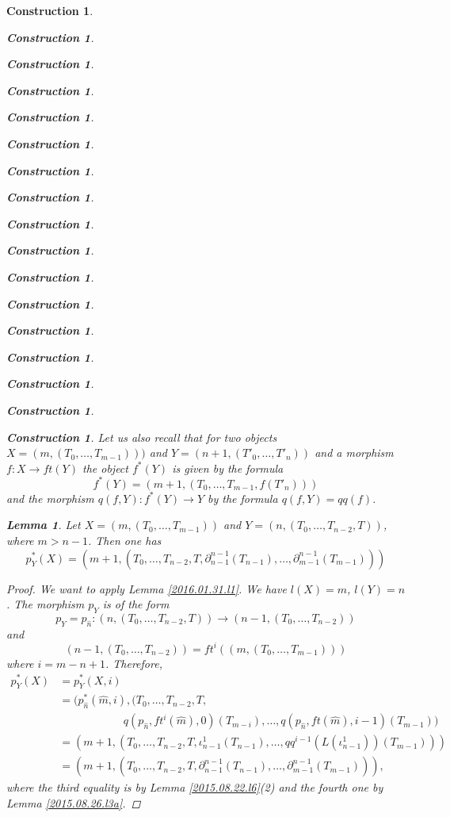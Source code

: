 \documentclass[onecolumn,12pt]{amsart}
\newtheorem{lemma}[proposition]{Lemma}
\numberwithin{proposition}{subsection}
\newtheorem{construction}[proposition]{Construction}
\newcommand{\sr}{\rightarrow}
\newcommand{\wh}{\widehat}
\newcommand{\spc}{{\,\,\,\,\,\,\,}}
\begin{document}
\begin{construction}
\begin{construction}
\begin{construction}
\begin{construction}
\begin{construction}
\begin{construction}
\begin{construction}
\begin{construction}
\begin{construction}
\begin{construction}
\begin{construction}
\begin{construction}
\begin{construction}
\begin{construction}
\begin{construction}
\begin{construction}
\begin{construction}
Let us also recall that for two objects $X=(m,(T_0,\dots,T_{m-1})))$ and
$Y=(n+1,(T'_0,\dots,T'_{n}))$ and a morphism $f:X\sr ft(Y)$ the object $f^*(Y)$
is given by the formula
%
\begin{equation}\label{2015.09.09.eq3old}
f^*(Y)=(m+1,(T_0,\dots,T_{m-1},f(T'_{n})))
\end{equation}%
%
and the morphism $q(f,Y):f^*(Y)\sr Y$ by the formula $q(f,Y)=qq(f)$. 
% 
\begin{lemma}
\label{2015.08.26.l8}
Let $X=(m,(T_0,\dots,T_{m-1}))$ and $Y=(n,(T_0,\dots,T_{n-2},T))$, where $m>n-1$. Then one has
%
$$p_{Y}^*(X)=(m+1,(T_0,\dots,T_{n-2},T,\partial_{n-1}^{n-1}(T_{n-1}),\dots,\partial_{m-1}^{n-1}(T_{m-1})))$$
%
\end{lemma}
%
\begin{proof}
We want to apply Lemma \ref{2016.01.31.l1}. We have $l(X)=m$, $l(Y)=n$. The morphism $p_Y$ is of the form
%
$$p_Y=p_{\wh{n}}:(n,(T_0,\dots,T_{n-2},T))\sr (n-1,(T_0,\dots,T_{n-2}))$$
%
and 
%
$$(n-1,(T_0,\dots,T_{n-2}))=ft^i((m,(T_0,\dots,T_{m-1})))$$
%
where $i=m-n+1$. Therefore, 
%
\begin{equation*}
  \begin{split}
    p_Y^*(X)&=p_Y^*(X,i)
    \\&=
    (p_{\wh{n}}^*(\wh{m},i), (T_0,\dots,T_{n-2},T,
    \\& \spc\spc\spc\spc\spc
           q(p_{\wh{n}},ft^i(\wh{m}),0)(T_{m-i}),\dots,q(p_{\wh{n}},ft(\wh{m}),i-1)(T_{m-1}))
    \\&=
    (m+1,(T_0,\dots,T_{n-2},T,\iota_{n-1}^1(T_{n-1}),\dots,qq^{i-1}(L(\iota_{n-1}^1))(T_{m-1})))
    \\&=
    (m+1,(T_0,\dots,T_{n-2},T,\partial_{n-1}^{n-1}(T_{n-1}),\dots,\partial_{m-1}^{n-1}(T_{m-1}))),
  \end{split}
\end{equation*}
%
where the third equality is by Lemma \ref{2015.08.22.l6}(2) and the fourth one by Lemma \ref{2015.08.26.l3a}. 
\end{proof}
%


\end{construction}
\end{construction}
\end{construction}
\end{construction}
\end{construction}
\end{construction}
\end{construction}
\end{construction}
\end{construction}
\end{construction}
\end{construction}
\end{construction}
\end{construction}
\end{construction}
\end{construction}
\end{construction}
\end{construction}
\end{document}
